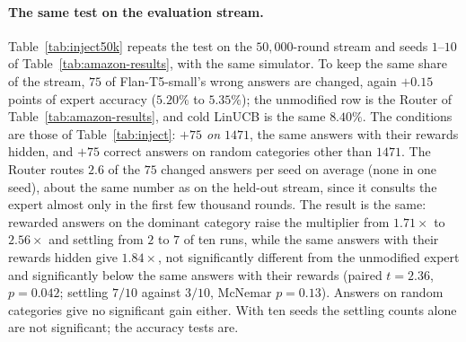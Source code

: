 \documentclass[anon]{alt2027} %
\begin{document}
\paragraph{The same test on the evaluation stream.}
Table~\ref{tab:inject50k} repeats the test on the $50{,}000$-round stream and
seeds $1$--$10$ of Table~\ref{tab:amazon-results}, with the same simulator.
To keep the same share of the stream, $75$ of Flan-T5-small's wrong answers
are changed, again $+0.15$ points of expert accuracy ($5.20\%$ to $5.35\%$);
the unmodified row is the Router of Table~\ref{tab:amazon-results}, and cold
LinUCB is the same $8.40\%$. The conditions are those of
Table~\ref{tab:inject}: \emph{$+75$ on $1471$}, the same answers with their
rewards hidden, and $+75$ correct answers on random categories other than
$1471$. The Router routes $2.6$ of the $75$ changed answers per seed on
average (none in one seed), about the same number as on the held-out stream,
since it consults the expert almost only in the first few thousand rounds.
The result is the same: rewarded answers on the dominant category raise the
multiplier from $1.71\times$ to $2.56\times$ and settling from $2$ to $7$ of
ten runs, while the same answers with their rewards hidden give $1.84\times$,
not significantly different from the unmodified expert and significantly
below the same answers with their rewards (paired $t=2.36$, $p=0.042$;
settling $7/10$ against $3/10$, McNemar $p=0.13$). Answers on random
categories give no significant gain either. With ten seeds the settling
counts alone are not significant; the accuracy tests are.

\begin{table}[h]
\centering
\caption{Changing $75$ of the expert's answers on the $50{,}000$-round
evaluation stream, seeds $1$--$10$. Tests are paired over the ten seeds
against the unmodified expert: a paired $t$-test on Router accuracy and an
exact McNemar test on whether the run settles on $1471$. Multipliers and
regret ratios are relative to cold LinUCB on the same seeds ($8.40\%$).}
\label{tab:inject50k}
\small
\setlength{\tabcolsep}{4pt}
\end{table}
\end{document}
